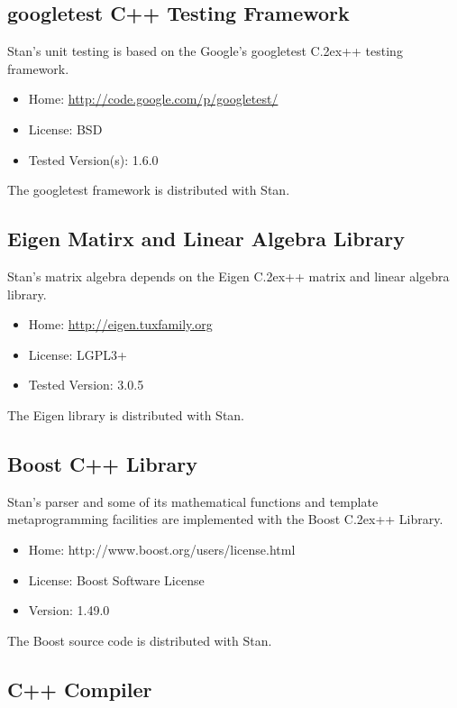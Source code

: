 \documentclass[10pt]{report}
\newcommand{\Stan}{Stan\xspace}
\newcommand*{\Cpp}{C\raise.2ex\hbox{\footnotesize ++}\xspace} %
\begin{document}
\subsection{googletest C++ Testing Framework}

\Stan's unit testing is based on the Google's googletest \Cpp testing
framework.  
%
\begin{itemize}
\item
Home: \url{http://code.google.com/p/googletest/}
\item
License: BSD
\item
Tested Version(s): 1.6.0
\end{itemize}
%
The googletest framework is distributed with \Stan.

\subsection{Eigen Matirx and Linear Algebra Library}

\Stan's matrix algebra depends on the Eigen \Cpp matrix and linear
algebra library.  
%
\begin{itemize}
\item Home: \url{http://eigen.tuxfamily.org}
\item License: LGPL3+
\item Tested Version: 3.0.5
\end{itemize}
%
The Eigen library is distributed with \Stan.

\subsection{Boost C++ Library}

\Stan's parser and some of its mathematical functions and 
template metaprogramming facilities are implemented with the Boost
\Cpp Library.  
%
\begin{itemize}
\item Home: http://www.boost.org/users/license.html
\item License: Boost Software License
\item Version: 1.49.0
\end{itemize}
%
The Boost source code is distributed with \Stan.

\subsection{C++ Compiler}
\end{document}
